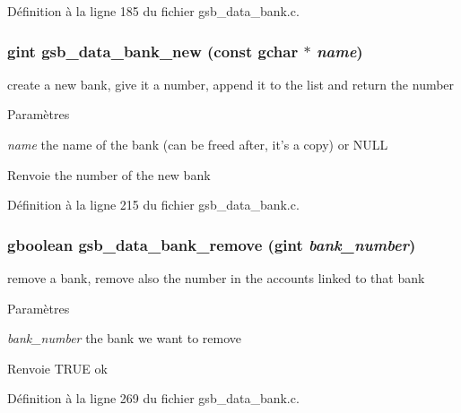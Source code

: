 Définition à la ligne 185 du fichier gsb\_\-data\_\-bank.c.

\subsubsection[{gsb\_\-data\_\-bank\_\-new}]{\setlength{\rightskip}{0pt plus 5cm}gint gsb\_\-data\_\-bank\_\-new (const gchar $\ast$ {\em name})}\label{gsb__data__bank_8c_a7721517163d313bbec38787a9c69386f}
create a new bank, give it a number, append it to the list and return the number


\begin{DoxyParams}{Paramètres}
\item[{\em name}]the name of the bank (can be freed after, it's a copy) or NULL\end{DoxyParams}
\begin{DoxyReturn}{Renvoie}
the number of the new bank 
\end{DoxyReturn}


Définition à la ligne 215 du fichier gsb\_\-data\_\-bank.c.

\subsubsection[{gsb\_\-data\_\-bank\_\-remove}]{\setlength{\rightskip}{0pt plus 5cm}gboolean gsb\_\-data\_\-bank\_\-remove (gint {\em bank\_\-number})}\label{gsb__data__bank_8c_aa64e705d04dde43b81ed590515087267}
remove a bank, remove also the number in the accounts linked to that bank


\begin{DoxyParams}{Paramètres}
\item[{\em bank\_\-number}]the bank we want to remove\end{DoxyParams}
\begin{DoxyReturn}{Renvoie}
TRUE ok 
\end{DoxyReturn}


Définition à la ligne 269 du fichier gsb\_\-data\_\-bank.c.

